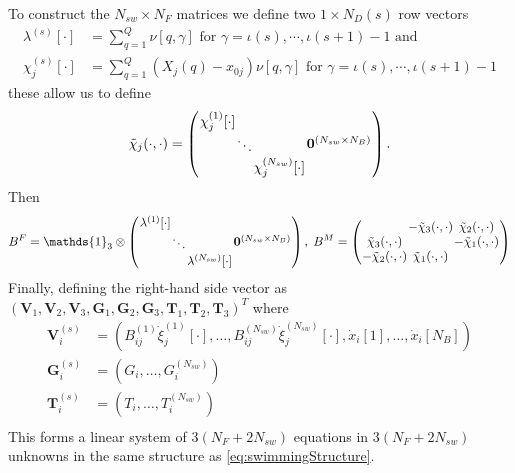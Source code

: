 \noindent To construct the $N_{sw} \times N_F$ matrices we define two $1 \times N_D(s)$ row vectors
\begin{equation*}
\begin{aligned}
    \lambda^{(s)}[\cdot] &= \sum_{q=1}^Q \nu[q,\gamma] \text{ for } \gamma = \iota(s),\cdots,\iota(s+1)-1 \text{ and } \\
    \chi_j^{(s)}[\cdot] &= \sum_{q=1}^{Q} (X_j(q) - x_{0 j})\nu[q,\gamma] \text{ for } \gamma = \iota(s),\cdots,\iota(s+1)-1
\end{aligned}
\end{equation*}
these allow us to define
\begin{equation*}
\arraycolsep=0.4pt\def\arraystretch{1}
    \tilde{\chi}_j(\cdot,\cdot)=\left(\begin{array}{cc}
         \begin{array}{ccc}
             \chi_j^{(1)}[\cdot] & & \\
              & \ddots & \\
              & & \chi_j^{(N_{sw})}[\cdot]
         \end{array} & \bm{0}^{(N_{sw} \times N_B)}
    \end{array}\right).
\end{equation*}
Then
\begin{equation*}
\arraycolsep=0.4pt\def\arraystretch{1}
    B^F = \mathds{1}_{3} \otimes \left(\begin{array}{cc}
         \begin{array}{ccc}
             \lambda^{(1)}[\cdot] & & \\
              & \ddots & \\
              & & \lambda^{(N_{sw})}[\cdot]
         \end{array} & \bm{0}^{(N_{sw} \times N_B)}
    \end{array}\right), \;
    B^M =
    \left(\begin{array}{ccc}
             & -\tilde{\chi}_3(\cdot,\cdot) & \tilde{\chi}_2(\cdot,\cdot)\\
            \tilde{\chi}_3(\cdot,\cdot) & & -\tilde{\chi}_1(\cdot,\cdot)\\
            -\tilde{\chi}_2(\cdot,\cdot) & \tilde{\chi}_1(\cdot,\cdot) &
          \end{array}\right)
\end{equation*}
Finally, defining the right-hand side vector as $(\bm{V}_1,\bm{V}_2,\bm{V}_3,\bm{G}_1,\bm{G}_2,\bm{G}_3,\bm{T}_1,\bm{T}_2,\bm{T}_3)^T$ where
\begin{equation*}
\begin{aligned}
        \bm{V}_i^{(s)} &= (B_{ij}^{(1)}\dot{\xi}_j^{(1)}[\cdot],\dots,B_{ij}^{(N_{sw})}\dot{\xi}_j^{(N_{sw})}[\cdot],\dot{x}_i[1],\dots,\dot{x}_i[N_B]) \\
        \bm{G}_i^{(s)} &= (G_i,\dots,G_i^{(N_{sw})}) \\
        \bm{T}_i^{(s)} &= (T_i,\dots,T_i^{(N_{sw})}) \\
\end{aligned}
\end{equation*}
This forms a linear system of $3(N_F+2N_{sw})$ equations in $3(N_F+2N_{sw})$ unknowns in the same structure as \cref{eq:swimmingStructure}.


